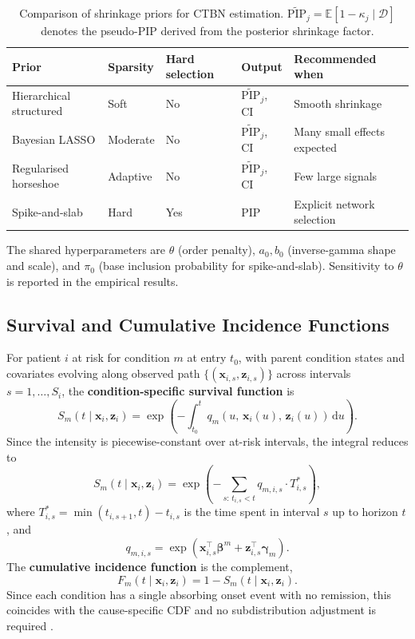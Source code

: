 \documentclass[12pt]{article}
\begin{document}
\begin{table}[h]
\centering
\caption{Comparison of shrinkage priors for CTBN estimation. $\widetilde{\mathrm{PIP}}_j = \mathbb{E}[1 - \kappa_j \mid \mathcal{D}]$ denotes the pseudo-PIP derived from the posterior shrinkage factor.}
\label{tab:priors}
\begin{tabular}{lllll}
\hline
Prior & Sparsity & Hard selection & Output & Recommended when \\
\hline
Hierarchical structured & Soft & No & $\widetilde{\mathrm{PIP}}_j$, CI & Smooth shrinkage \\
Bayesian LASSO & Moderate & No & $\widetilde{\mathrm{PIP}}_j$, CI & Many small effects expected \\
Regularised horseshoe & Adaptive & No & $\widetilde{\mathrm{PIP}}_j$, CI & Few large signals \\
Spike-and-slab & Hard & Yes & PIP & Explicit network selection \\
\hline
\end{tabular}
\end{table}
The shared hyperparameters are $\theta$ (order penalty), $a_0, b_0$ (inverse-gamma shape and scale), and $\pi_0$ (base inclusion probability for spike-and-slab). Sensitivity to $\theta$ is reported in the empirical results.


\subsection{Survival and Cumulative Incidence Functions}

For patient $i$ at risk for condition $m$ at entry $t_0$, with parent condition 
states and covariates evolving along observed path $\{(\mathbf{x}_{i,s}, 
\mathbf{z}_{i,s})\}$ across intervals $s = 1, \dots, S_i$, the 
\textbf{condition-specific survival function} is
\[
S_m(t \mid \mathbf{x}_i, \mathbf{z}_i)
= \exp\!\left(-\int_{t_0}^{t} q_m(u,\, \mathbf{x}_i(u),\, \mathbf{z}_i(u))\,
\mathrm{d}u\right).
\]
Since the intensity is piecewise-constant over at-risk intervals, the integral 
reduces to
\[
S_m(t \mid \mathbf{x}_i, \mathbf{z}_i)
= \exp\!\left(-\sum_{s:\, t_{i,s} < t} q_{m,i,s}\cdot T_{i,s}^*\right),
\]
where $T_{i,s}^* = \min(t_{i,s+1}, t) - t_{i,s}$ is the time spent in interval 
$s$ up to horizon $t$, and
\[
q_{m,i,s}
= \exp\!\left(\mathbf{x}_{i,s}^\top \boldsymbol{\beta}^m
+ \mathbf{z}_{i,s}^\top \boldsymbol{\gamma}_m\right).
\]
The \textbf{cumulative incidence function} is the complement,
\[
F_m(t \mid \mathbf{x}_i, \mathbf{z}_i)
= 1 - S_m(t \mid \mathbf{x}_i, \mathbf{z}_i).
\]
Since each condition has a single absorbing onset event with no remission, this 
coincides with the cause-specific CDF and no subdistribution adjustment is 
required \citep{FineGray1999, Putter2007}.
\end{document}
